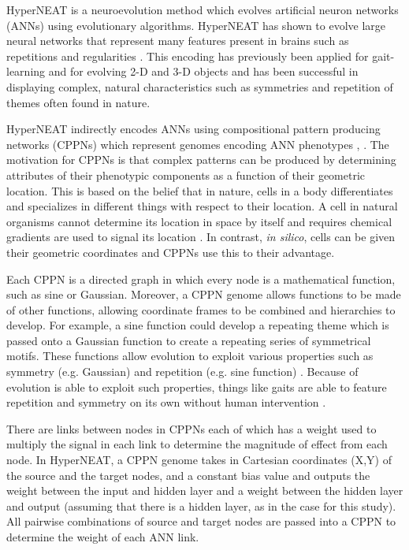 HyperNEAT is a neuroevolution method which evolves artificial neuron networks (ANNs) using evolutionary algorithms.
HyperNEAT has shown to evolve large neural networks that represent many features present in brains such as repetitions and regularities \cite{stanley3}. 
This encoding has previously been applied for gait-learning \cite{yos:clune} and for evolving 2-D and 3-D objects \cite{clune:lipson} and has been successful in displaying complex, natural characteristics such as symmetries and repetition of themes often found in nature.


HyperNEAT indirectly encodes ANNs using compositional pattern producing networks (CPPNs) which represent genomes encoding ANN phenotypes \cite{stanley1}, \cite{stanley2}. 
The motivation for CPPNs is that complex patterns can be produced by determining attributes of their phenotypic components as a function of their geometric location. 
This is based on the belief that in nature, cells in a body differentiates and specializes in different things with respect to their location. 
A cell in natural organisms cannot determine its location in space by itself and requires chemical gradients are used to signal its location \cite{carroll}. 
In contrast, \emph{in silico}, cells can be given their geometric coordinates and CPPNs use this to their advantage. 


Each CPPN is a directed graph in which every node is a mathematical function, such as sine or Gaussian. 
Moreover, a CPPN genome allows functions to be made of other functions, allowing coordinate frames to be combined and hierarchies to develop.
For example, a sine function could develop a repeating theme which is passed onto a Gaussian function to create a repeating series of symmetrical motifs. 
These functions allow evolution to exploit various properties such as symmetry (e.g. Gaussian) and repetition (e.g. sine function) \cite{stanley1}. 
Because of evolution is able to exploit such properties, things like gaits are able to feature repetition and symmetry on its own without human intervention \cite{clune1}. 


There are links between nodes in CPPNs each of which has a weight used to multiply the signal in each link to determine the magnitude of effect from each node. 
In HyperNEAT, a CPPN genome takes in Cartesian coordinates (X,Y) of the source and the target nodes, and a constant bias value and outputs the weight between the input and hidden layer and a weight between the hidden layer and output (assuming that there is a hidden layer, as in the case for this study). 
All pairwise combinations of source and target nodes are passed into a CPPN to determine the weight of each ANN link. 


